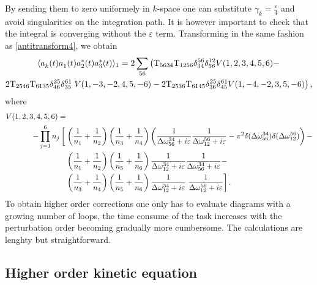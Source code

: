 By sending them to zero uniformely in $k$-space one can substitute $\gamma_k= \frac{\varepsilon}{4}$ and avoid singularities on the integration path. It is however important 
to check that the integral is converging without the $\varepsilon$ term. Transforming in the same fashion as \eqref{antitransform4}, we obtain 
\begin{multline}
    \langle a_k^{}(t) a_1^{}(t) a_2^*(t)a_3^*(t) \rangle_{1} = 2\sum_{56} \left( \mathrm{T}_{5634}\mathrm{T}_{1256}\delta^{56}_{34}\delta^{12}_{56}  V(1,2,3,4,5,6) - \right.\\
    2\mathrm{T}_{2546}\mathrm{T}_{6135}\delta^{25}_{46}\delta^{61}_{35}
    \left.V(1,-3,-2,4,5,-6) - 2\mathrm{T}_{2536}\mathrm{T}_{6145}\delta^{25}_{36}\delta^{61}_{45} V(1,-4,-2,3,5,-6)  \right),
    \label{finalfourpoint}
\end{multline}
where 
\begin{equation}
    \begin{aligned}
        V(1,2,3,4,5,6) =&
        \\
        -\prod_{j=1}^{6}n_j\left[ \vphantom{\frac{1}{n_7}} \right.
        &\left( \frac{1}{n_1} +\frac{1}{n_2} \right) \left( \frac{1}{n_3} +\frac{1}{n_4} \right)
        \left( \frac{1}{\delomega^{34}_{56} + i\varepsilon}\frac{1}{\delomega^{56}_{12} + i\varepsilon} - \pi^2\delta(\delomega^{34}_{56})\delta(\delomega^{56}_{12})\right)-  
        \\
        &\left( \frac{1}{n_1} +\frac{1}{n_2} \right) \left( \frac{1}{n_5} +\frac{1}{n_6} \right)
        \frac{1}{\delomega^{34}_{12} + i\varepsilon}\frac{1}{\delomega^{34}_{56} + i\varepsilon} -
        \\
        &\left( \frac{1}{n_3} +\frac{1}{n_4} \right) \left( \frac{1}{n_5} +\frac{1}{n_6} \right)
        \frac{1}{\delomega^{34}_{12} + i\varepsilon}\left.\frac{1}{\delomega^{56}_{12} + i\varepsilon}
        \right].
    \end{aligned}
\end{equation}
To obtain higher order corrections one only has to evaluate diagrams with a growing number of loops, the time consume of the task increases with the perturbation order becoming
gradually more cumbersome. The calculations are lenghty but straightforward. \\
\subsection{Higher order kinetic equation}

